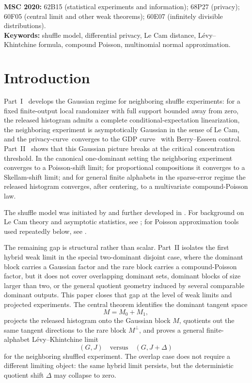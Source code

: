 \documentclass{article}
\newcommand{\1}{\mathbf 1}
\newcommand{\privacycurve}{\mbox{privacy-curve}}
\begin{document}
\noindent\textbf{MSC 2020:} 62B15 (statistical experiments and information); 68P27 (privacy); 60F05 (central limit and other weak theorems); 60E07 (infinitely divisible distributions).\\[2pt]
\noindent\textbf{Keywords:} shuffle model, differential privacy, Le Cam distance, L\'evy--Khintchine formula, compound Poisson, multinomial normal approximation.

\tableofcontents

\section{Introduction}

Part~I~\cite{Shv26I} develops the Gaussian regime for neighboring shuffle experiments: for a fixed finite-output
local randomizer with full support bounded away from zero, the released histogram admits a complete
conditional-expectation linearization, the neighboring experiment is asymptotically Gaussian in the sense of
Le Cam, and the \privacycurve\ converges to the GDP curve~\cite{DRS22} with Berry--Esseen control.
Part~II~\cite{Shv26II} shows that this Gaussian picture breaks at the critical concentration threshold.
In the canonical one-dominant setting the neighboring experiment converges to a Poisson-shift limit; for
proportional compositions it converges to a Skellam-shift limit; and for general finite alphabets in the
sparse-error regime the released histogram converges, after centering, to a multivariate compound-Poisson law.

The shuffle model was initiated by \cite{EFM19,CSU19} and further developed in \cite{BBG19,FMT21,FMT23}.
For background on Le Cam theory and asymptotic statistics, see \cite{LeC86,vdV98}; for Poisson
approximation tools used repeatedly below, see \cite{BHJ92,Roos19}.

The remaining gap is structural rather than scalar. Part~II isolates the first hybrid weak limit in the
special two-dominant disjoint case, where the dominant block carries a Gaussian factor and the rare block
carries a compound-Poisson factor, but it does not cover overlapping dominant sets, dominant blocks of size
larger than two, or the general quotient geometry induced by several comparable dominant outputs. This paper
closes that gap at the level of weak limits and projected experiments. The central theorem identifies the
dominant tangent space
\[
M=M_0+M_1,
\]
projects the released histogram onto the Gaussian block $M$, quotients out the same tangent directions to the
rare block $M^\perp$, and proves a general finite-alphabet L\'evy--Khintchine limit
\[
(G,J)\quad\text{versus}\quad (G,J+\Delta)
\]
for the neighboring shuffled experiment. The overlap case does not require a different limiting object: the same
hybrid limit persists, but the deterministic quotient shift $\Delta$ may collapse to zero.
\end{document}
